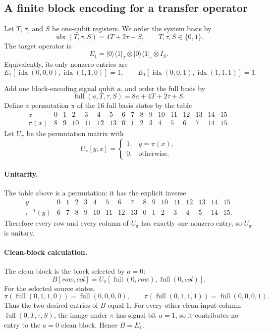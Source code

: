 
\subsection{A finite block encoding for a transfer operator}

Let \(T\), \(\tau\), and \(S\) be one-qubit registers.  We order the system
basis by
\[
  \operatorname{idx}(T,\tau,S)=4T+2\tau+S ,
  \qquad T,\tau,S\in\{0,1\}.
\]
The target operator is
\[
  E_1
  =
  |0\rangle\!\langle 1|_T
  \otimes
  |0\rangle\!\langle 1|_\tau
  \otimes I_S .
\]
Equivalently, its only nonzero entries are
\[
  E_1[\operatorname{idx}(0,0,0),\operatorname{idx}(1,1,0)] = 1,
  \qquad
  E_1[\operatorname{idx}(0,0,1),\operatorname{idx}(1,1,1)] = 1 .
\]

Add one block-encoding signal qubit \(a\), and order the full basis by
\[
  \operatorname{full}(a,T,\tau,S)
  =
  8a+4T+2\tau+S .
\]
Define a permutation \(\pi\) of the \(16\) full basis states by the table
\[
\begin{array}{c|cccccccccccccccc}
x&0&1&2&3&4&5&6&7&8&9&10&11&12&13&14&15\\
\hline
\pi(x)&8&9&10&11&12&13&0&1&2&3&4&5&6&7&14&15 .
\end{array}
\]
Let \(U_\pi\) be the permutation matrix with
\[
  U_\pi[y,x]=
  \begin{cases}
    1,& y=\pi(x),\\
    0,& \text{otherwise}.
  \end{cases}
\]

\paragraph{Unitarity.}
The table above is a permutation: it has the explicit inverse
\[
\begin{array}{c|cccccccccccccccc}
y&0&1&2&3&4&5&6&7&8&9&10&11&12&13&14&15\\
\hline
\pi^{-1}(y)&6&7&8&9&10&11&12&13&0&1&2&3&4&5&14&15 .
\end{array}
\]
Therefore every row and every column of \(U_\pi\) has exactly one nonzero
entry, so \(U_\pi\) is unitary.

\paragraph{Clean-block calculation.}
The clean block is the block selected by \(a=0\):
\[
  B[row,col] =
  U_\pi[\operatorname{full}(0,row),\operatorname{full}(0,col)] .
\]
For the selected source states,
\[
  \pi(\operatorname{full}(0,1,1,0))=\operatorname{full}(0,0,0,0),
  \qquad
  \pi(\operatorname{full}(0,1,1,1))=\operatorname{full}(0,0,0,1).
\]
Thus the two desired entries of \(B\) equal \(1\).  For every other clean input
column \(\operatorname{full}(0,T,\tau,S)\), the image under \(\pi\) has
signal bit \(a=1\), so it contributes no entry to the \(a=0\) clean block.
Hence \(B=E_1\).


